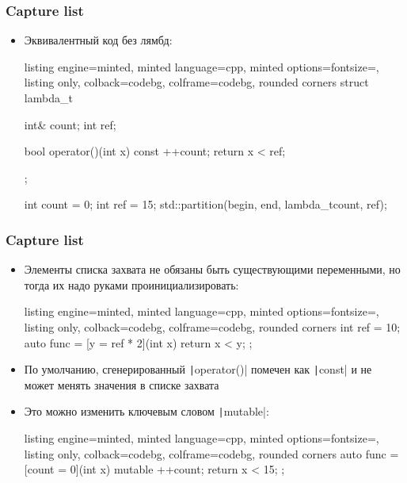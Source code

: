 \documentclass[10pt]{beamer}
\begin{document}
\begin{frame}[fragile]
\frametitle{Capture list}
\begin{itemize}
\item Эквивалентный код без лямбд:
\begin{tcblisting}{listing engine=minted, minted language=cpp, minted options={fontsize=\scriptsize}, listing only, colback=codebg, colframe=codebg, rounded corners}
struct lambda_t {
  int& count;
  int ref;

  bool operator()(int x) const {
    ++count;
    return x < ref;
  }
};

int count = 0;
int ref = 15;
std::partition(begin, end, lambda_t{count, ref});
\end{tcblisting}
\end{itemize}
\end{frame}

\begin{frame}[fragile]
\frametitle{Capture list}
\begin{itemize}
\item Элементы списка захвата не обязаны быть существующими переменными, но тогда их надо руками проинициализировать:
\begin{tcblisting}{listing engine=minted, minted language=cpp, minted options={fontsize=\scriptsize}, listing only, colback=codebg, colframe=codebg, rounded corners}
int ref = 10;
auto func = [y = ref * 2](int x){ return x < y; };
\end{tcblisting}
\pause
{}
\item По умолчанию, сгенерированный \texttt|operator()| помечен как \texttt|const| и не может менять значения в списке захвата
\pause
\item Это можно изменить ключевым словом \texttt|mutable|:
\begin{tcblisting}{listing engine=minted, minted language=cpp, minted options={fontsize=\scriptsize}, listing only, colback=codebg, colframe=codebg, rounded corners}
auto func = [count = 0](int x) mutable {
  ++count;
  return x < 15;
};
\end{tcblisting}
\end{itemize}
\end{frame}
\end{document}
